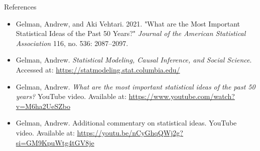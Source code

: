 \documentclass{beamer}
\begin{document}
\begin{frame}{References}
\begin{itemize}
    \item Gelman, Andrew, and Aki Vehtari. 2021. "What are the Most Important Statistical Ideas of the Past 50 Years?" 
    \textit{Journal of the American Statistical Association} 116, no. 536: 2087–2097.
    \item Gelman, Andrew. \textit{Statistical Modeling, Causal Inference, and Social Science}. Accessed at: \url{https://statmodeling.stat.columbia.edu/}
    \item Gelman, Andrew. \textit{What are the most important statistical ideas of the past 50 years?} YouTube video. Available at: \url{https://www.youtube.com/watch?v=M6ha2UeSZbo}
    \item Gelman, Andrew. Additional commentary on statistical ideas. YouTube video. Available at: \url{https://youtu.be/nCyGhqQWj2g?si=GM9KpuWtg4tGV8je}
\end{itemize}
\end{frame}
\end{document}
